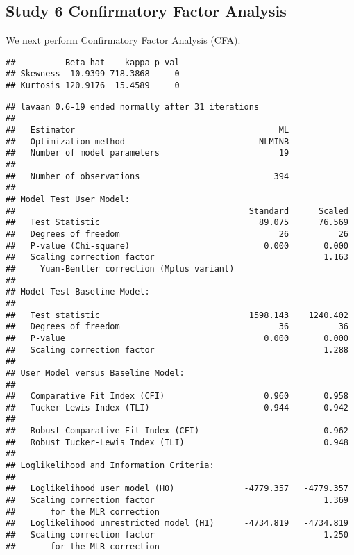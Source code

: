 \documentclass[
  doc,draftall]{apa6}
\begin{document}
\subsection{Study 6 Confirmatory Factor Analysis}\label{study-6-confirmatory-factor-analysis}

We next perform Confirmatory Factor Analysis (CFA).

\begin{verbatim}
##          Beta-hat    kappa p-val
## Skewness  10.9399 718.3868     0
## Kurtosis 120.9176  15.4589     0
\end{verbatim}

\begin{verbatim}
## lavaan 0.6-19 ended normally after 31 iterations
## 
##   Estimator                                         ML
##   Optimization method                           NLMINB
##   Number of model parameters                        19
## 
##   Number of observations                           394
## 
## Model Test User Model:
##                                               Standard      Scaled
##   Test Statistic                                89.075      76.569
##   Degrees of freedom                                26          26
##   P-value (Chi-square)                           0.000       0.000
##   Scaling correction factor                                  1.163
##     Yuan-Bentler correction (Mplus variant)                       
## 
## Model Test Baseline Model:
## 
##   Test statistic                              1598.143    1240.402
##   Degrees of freedom                                36          36
##   P-value                                        0.000       0.000
##   Scaling correction factor                                  1.288
## 
## User Model versus Baseline Model:
## 
##   Comparative Fit Index (CFI)                    0.960       0.958
##   Tucker-Lewis Index (TLI)                       0.944       0.942
##                                                                   
##   Robust Comparative Fit Index (CFI)                         0.962
##   Robust Tucker-Lewis Index (TLI)                            0.948
## 
## Loglikelihood and Information Criteria:
## 
##   Loglikelihood user model (H0)              -4779.357   -4779.357
##   Scaling correction factor                                  1.369
##       for the MLR correction                                      
##   Loglikelihood unrestricted model (H1)      -4734.819   -4734.819
##   Scaling correction factor                                  1.250
##       for the MLR correction                                      

\end{verbatim}
\end{document}
